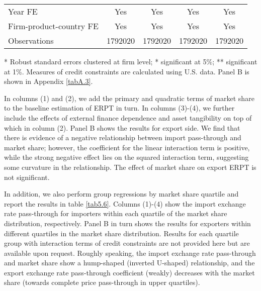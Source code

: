 \begin{table}[htb]
\begin{threeparttable}
\begin{tabular}{lcccc}
		Year FE  & Yes   & Yes   & Yes   & Yes \\
		Firm-product-country FE & Yes   & Yes   & Yes   & Yes \\
		Observations & 1792020 & 1792020 & 1792020 & 1792020 \\
		\bottomrule
	\end{tabular}
	\begin{tablenotes}
	\footnotesize
	\item[*] Robust standard errors clustered at firm level; * significant at 5\%; ** significant at 1\%. Measures of credit constraints are calculated using U.S. data. Panel B is shown in Appendix \ref{tabA.3}.
	\end{tablenotes}
	\end{threeparttable}
	\label{tab5.5}
\end{table}

In columns (1) and (2), we add the primary and quadratic terms of market share to the baseline estimation of ERPT in turn. In columns (3)-(4), we further include the effects of external finance dependence and asset tangibility on top of which in column (2). Panel B shows the results for export side. We find that there is evidence of a negative relationship between import pass-through and market share; however, the coefficient for the linear interaction term is positive, while the strong negative effect lies on the squared interaction term, suggesting some curvature in the relationship. The effect of market share on export ERPT is not significant. 

In addition, we also perform group regressions by market share quartile and report the results in table \ref{tab5.6}. Columns (1)-(4) show the import exchange rate pass-through for importers within each quartile of the market share distribution, respectively. Panel B in turn shows the results for exporters within different quartiles in the market share distribution. Results for each quartile group with interaction terms of credit constraints are not provided here but are available upon request. Roughly speaking, the import exchange rate pass-through and market share show a hump-shaped (inverted U-shaped) relationship, and the export exchange rate pass-through coefficient (weakly) decreases with the market share (towards complete price pass-through in upper quartiles).

